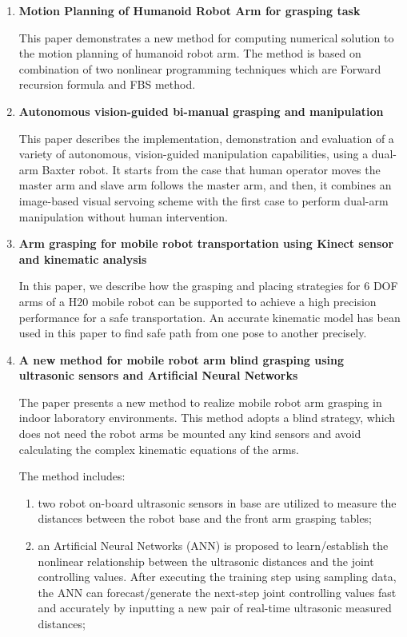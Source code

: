 \documentclass[10pt,twocolumn,letterpaper]{article}
\begin{document}
\begin{enumerate}
\item \textbf{Motion Planning of Humanoid Robot Arm for grasping task} \cite{4516345}

This paper demonstrates a new method for computing numerical solution to the motion planning of humanoid robot arm. The method is based on combination of two nonlinear programming techniques which are Forward recursion formula and FBS method. 

\item \textbf{Autonomous vision-guided bi-manual grasping and manipulation} \cite{8025192}

This paper describes the implementation, demonstration and evaluation of a variety of autonomous, vision-guided manipulation capabilities, using a dual-arm Baxter robot. It starts from the case that human operator  moves the master arm and slave arm follows the master arm, and then, it combines an image-based visual servoing scheme with the first case to perform dual-arm manipulation without human intervention. 
  
\item \textbf{Arm grasping for mobile robot transportation using Kinect sensor and kinematic analysis} \cite{7151321}

In this paper, we describe how the grasping and placing strategies for 6 DOF arms of a H20 mobile robot can be supported to achieve a high precision performance for a safe transportation. An accurate kinematic model has bean used in this paper to find safe path from one pose to another precisely.

\item \textbf{A new method for mobile robot arm blind grasping using ultrasonic sensors and Artificial Neural Networks} \cite{6739654}

The paper presents a new method to realize mobile robot arm grasping in indoor laboratory environments. This
method adopts a blind strategy, which does not need the robot arms be mounted any kind sensors and avoid calculating the complex kinematic equations of the arms.

The method includes:
\begin{enumerate}
\item two robot on-board ultrasonic sensors in base are utilized to measure the distances between the robot base and the front arm grasping tables; 

\item an Artificial Neural Networks (ANN) is proposed to learn/establish the nonlinear relationship between
the ultrasonic distances and the joint controlling values. After executing the training step using sampling data, the ANN can forecast/generate the next-step joint controlling values fast and
accurately by inputting a new pair of real-time ultrasonic measured distances; 


\end{enumerate}
\end{enumerate}
\end{document}
